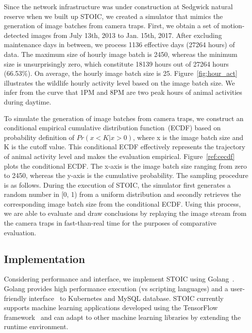 Since the network infrastructure was under construction at Sedgwick natural
reserve when we built up STOIC, we created a simulator that mimics the
generation of image batches from camera traps. First, we obtain a set of
motion-detected images from July 13th, 2013 to Jan. 15th, 2017. After
excluding maintenance days in between, we process 1136 effective days (27264
hours) of data. The maximum size of hourly image batch is 2450, whereas the
minimum size is unsurprisingly zero, which constitute 18139 hours out of 27264
hours (66.53\%). On average, the hourly image batch size is 25.
Figure~\ref{fig:hour_act} illustrates the wildlife hourly activity level based
on the image batch size. We infer from the curve that 1PM and 8PM are two peak
hours of animal activities during daytime. 

To simulate the generation of image batches from camera traps, we construct an
conditional empirical cumulative distribution function~(ECDF) based on
probability definition of  $Pr(x < K | x > 0)$, where x is the image batch
size and K is the cutoff value. This conditional ECDF effectively represents
the trajectory of animal activity level and makes the evaluation empirical.
Figure~\ref{ref:cecdf} plots the conditional ECDF. The x-axis is the image
batch size ranging from zero to 2450, whereas the y-axis is the cumulative
probability. The sampling procedure is as follows.  During the execution of STOIC, the simulator first generates a
random number in [0, 1) from a uniform distribution and secondly retrieves the
corresponding image batch size from the conditional ECDF. Using this process,
we are able to evaluate and draw conclusions by replaying the image stream
from the camera traps in fast-than-real time for the purposes of comparative
evaluation.



 \subsection{Implementation}

Considering performance and interface, we implement STOIC using
Golang~\cite{ref:golang}. Golang provides high performance execution (vs
scripting languages) and a user-friendly interface~\cite{ref:client-go} to
Kubernetes and MySQL database. STOIC currently supports machine learning
applications developed using the TensorFlow framework~\cite{ref:tensorflow}
and can adapt to other machine learning libraries by extending the runtime
environment.
 
